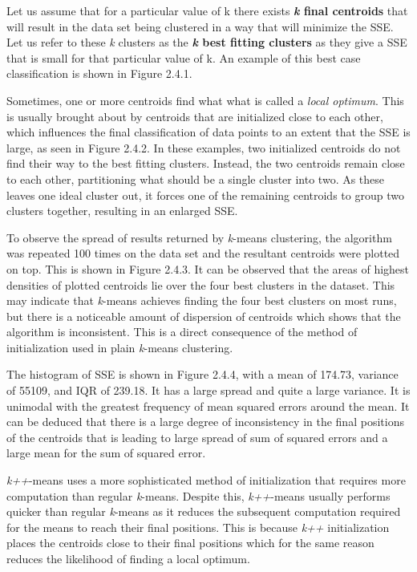 \documentclass[12pt]{article}
\begin{document}
  \par Let us assume that for a particular value of k there exists \textbf{\textit{k} final centroids} that will result in the data set being clustered in a way that will minimize the SSE. Let us refer to these \textit{k} clusters as the \textbf{\textit{k} best fitting clusters} as they give a SSE that is small for that particular value of k. An example of this best case classification is shown in Figure 2.4.1.

  \par Sometimes, one or more centroids find what what is called a \textit{local optimum}. This is usually brought about by centroids that are initialized close to each other, which influences the final classification of data points to an extent that the SSE is large, as seen in Figure 2.4.2. In these examples, two initialized centroids do not find their way to the best fitting clusters. Instead, the two centroids remain close to each other, partitioning what should be a single cluster into two. As these leaves one ideal cluster out, it forces one of the remaining centroids to group two clusters together, resulting in an enlarged SSE.

  \par To observe the spread of results returned by \textit{k}-means clustering, the algorithm was repeated 100 times on the data set and the resultant centroids were plotted on top. This is shown in Figure 2.4.3. It can be observed that the areas of highest densities of plotted centroids lie over the four best clusters in the dataset. This may indicate that \textit{k}-means achieves finding the four best clusters on most runs, but there is a noticeable amount of dispersion of centroids which shows that the algorithm is inconsistent. This is a direct consequence of the method of initialization used in plain \textit{k}-means clustering.

  \par The histogram of SSE is shown in Figure 2.4.4, with a mean of 174.73, variance of 55109, and IQR of 239.18. It has a large spread and quite a large variance. It is unimodal with the greatest frequency of mean squared errors around the mean. It can be deduced that there is a large degree of inconsistency in the final positions of the centroids that is leading to large spread of sum of squared errors and a large mean for the sum of squared error.

  \par \textit{k++}-means uses a more sophisticated method of initialization that requires more computation than regular \textit{k}-means. Despite this, \textit{k++}-means usually performs quicker than regular \textit{k}-means as it reduces the subsequent computation required for the means to reach their final positions. This is because \textit{k++} initialization places the centroids close to their final positions which for the same reason reduces the likelihood of finding a local optimum.
\end{document}
